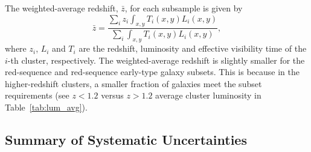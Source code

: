 The weighted-average redshift, $\bar{z}$, for each subsample is given by
\begin{equation}
\bar{z} = \frac{\sum_i z_i \int_{x,y} T_i(x,y) L_i (x,y)}
        {\sum_i \int_{x,y} T_i (x,y) L_i (x,y)},
\end{equation}
where $z_i$, $L_i$ and $T_i$ are the redshift, luminosity and
effective visibility time of the $i$-th cluster, respectively. The
weighted-average redshift is slightly smaller for the red-sequence and
red-sequence early-type galaxy subsets. This is because in the
higher-redshift clusters, a smaller fraction of galaxies meet the
subset requirements (see $z<1.2$ versus $z>1.2$ average cluster
luminosity in Table~\ref{tab:lum_avg}).


\subsection{Summary of Systematic Uncertainties} \label{sec:clrate_results_sys}

